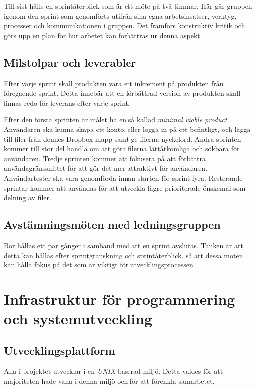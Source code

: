 \documentclass[a4paper,12pt,oneside,final]{extbook}
\begin{document}
Till sist hålls en sprintåterblick som är ett möte på två timmar.
Här går gruppen igenom den  sprint som genomförts utifrån sina egna
arbetsinsatser, verktyg, processer och kommunikationen i gruppen.
Det framförs konstruktiv kritik och görs upp en plan för hur
arbetet kan förbättras ur denna aspekt.

\section{Milstolpar och leverabler}
Efter varje sprint skall produkten vara ett inkrement på produkten
från föregående sprint. Detta innebär att en förbättrad version av produkten
skall finnas redo för leverans efter varje sprint.

Efter den första sprinten är målet ha en så kallad \emph{minimal viable product}.
Användaren ska kunna skapa ett konto, eller logga in på ett befintligt, och
lägga till filer från dennes Dropbox-mapp samt ge filerna nyckelord. Andra
sprinten kommer till stor del handla om att göra filerna lättåtkomliga och
sökbara för användaren. Tredje sprinten kommer att fokusera på att förbättra
användagränssnittet för att gör det mer attraktivt för användaren.
Användartester ska vara genomförda innan starten för sprint fyra. Resterande
sprintar kommer att användas för att utveckla lägre prioriterade önskemål som
delning av filer.

\section{Avstämningsmöten med ledningsgruppen}
Bör hållas ett par gånger i samband med att en sprint avslutas.
Tanken är att detta kan hållas efter sprintgranskning och sprintåterblick,
så att dessa möten kan hålla fokus på det som är
viktigt för utvecklingsprocessen.

\chapter{Infrastruktur för programmering och systemutveckling}

\section{Utvecklingsplattform}
Alla i projektet utvecklar i en \emph{UNIX}-baserad miljö. Detta valdes
för att majoriteten hade vana i denna miljö och för att förenkla
samarbetet.
\end{document}

